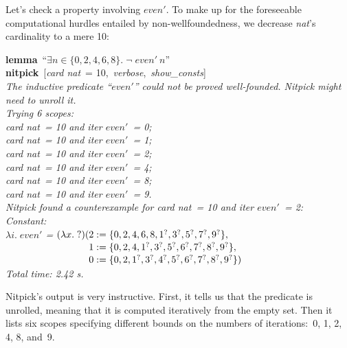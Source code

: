 \documentclass[a4paper,12pt]{article}
\def\unk{{?}}
\def\undef{(\lambda x.\; \unk)}
\def\Q{{\smash{\lower.2ex\hbox{$\scriptstyle?$}}}}
\begin{document}
Let's check a property involving $\textit{even}'$. To make up for the
foreseeable computational hurdles entailed by non-wellfoundedness, we decrease
\textit{nat}'s cardinality to a mere 10:

\prew
\textbf{lemma}~``$\exists n \in \{0, 2, 4, 6, 8\}.\;
\lnot\;\textit{even}'~n$'' \\
\textbf{nitpick}~[\textit{card nat}~= 10,\, \textit{verbose},\, \textit{show\_consts}] \\[2\smallskipamount]
\slshape
The inductive predicate ``$\textit{even}'\!$'' could not be proved well-founded.
Nitpick might need to unroll it. \\[2\smallskipamount]
Trying 6 scopes: \\
\hbox{}\qquad \textit{card nat}~= 10 and \textit{iter} $\textit{even}'$~= 0; \\
\hbox{}\qquad \textit{card nat}~= 10 and \textit{iter} $\textit{even}'$~= 1; \\
\hbox{}\qquad \textit{card nat}~= 10 and \textit{iter} $\textit{even}'$~= 2; \\
\hbox{}\qquad \textit{card nat}~= 10 and \textit{iter} $\textit{even}'$~= 4; \\
\hbox{}\qquad \textit{card nat}~= 10 and \textit{iter} $\textit{even}'$~= 8; \\
\hbox{}\qquad \textit{card nat}~= 10 and \textit{iter} $\textit{even}'$~= 9. \\[2\smallskipamount]
Nitpick found a counterexample for \textit{card nat}~= 10 and \textit{iter} $\textit{even}'$~= 2: \\[2\smallskipamount]
\hbox{}\qquad Constant: \nopagebreak \\
\hbox{}\qquad\qquad $\lambda i.\; \textit{even}'$ = $\undef(\!\begin{aligned}[t]
& 2 := \{0, 2, 4, 6, 8, 1^\Q, 3^\Q, 5^\Q, 7^\Q, 9^\Q\}, \\[-2pt]
& 1 := \{0, 2, 4, 1^\Q, 3^\Q, 5^\Q, 6^\Q, 7^\Q, 8^\Q, 9^\Q\}, \\[-2pt]
& 0 := \{0, 2, 1^\Q, 3^\Q, 4^\Q, 5^\Q, 6^\Q, 7^\Q, 8^\Q, 9^\Q\})\end{aligned}$ \\[2\smallskipamount]
Total time: 2.42 s.
\postw

Nitpick's output is very instructive. First, it tells us that the predicate is
unrolled, meaning that it is computed iteratively from the empty set. Then it
lists six scopes specifying different bounds on the numbers of iterations:\ 0,
1, 2, 4, 8, and~9.
\end{document}
